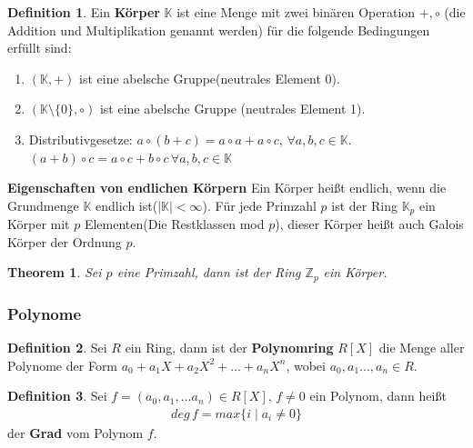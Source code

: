 \documentclass[12pt,oneside]{article}
\newtheorem{theorem}{Theorem}[section]
\theoremstyle{remark}
\theoremstyle{definition}
\newtheorem{definition}{Definition}[section]
\begin{document}
\begin{definition}
Ein \textbf{Körper} $\mathbb{K}$ ist eine Menge mit zwei binären Operation $+,\circ$ (die Addition und Multiplikation genannt werden) für die folgende Bedingungen erfüllt sind:
\begin{enumerate}
    \item $(\mathbb{K},+)$ ist eine abelsche Gruppe(neutrales Element 0).
    
    \item $(\mathbb{K}\setminus \{ 0\}, \circ)$ ist eine abelsche Gruppe (neutrales Element 1).
    
    \item Distributivgesetze:\newline
        $a \circ (b + c) = a \circ a + a \circ c, \, \forall a,b,c \in \mathbb{K}$.\newline
        $(a + b) \circ c = a \circ c + b \circ c \, \forall a,b,c \in \mathbb{K}$
\end{enumerate}
\end{definition}

\textbf{Eigenschaften von endlichen Körpern}\newline
Ein Körper heißt endlich, wenn die Grundmenge $\mathbb{K}$ endlich ist($|\mathbb{K}| < \infty$). Für jede Primzahl $p$ ist der Ring $\mathbb{K}_p$ ein Körper mit $p$ Elementen(Die Restklassen mod $p$), dieser Körper heißt auch Galois Körper der Ordnung $p$.

\begin{theorem}
Sei $p$ eine Primzahl, dann ist der Ring $\mathbb{Z}_p$ ein Körper.
\end{theorem}


 

\subsubsection{Polynome}

\begin{definition}
Sei $R$ ein Ring, dann ist der \textbf{Polynomring} $R[X]$ die Menge aller Polynome der Form $a_{0} + a_{1}X + a_{2} X^2 + ... + a_{n}X^n$, wobei $a_{0},a_{1}...,a_{n} \in R$.
\end{definition}

\smallskip

\begin{definition}
Sei $f = (a_0, a_1,...a_n) \in R[X], \, f \neq 0 $ ein Polynom, dann heißt
\begin{align*}
    deg \, f = max \{ i  \mid a_i \neq 0 \}
\end{align*}
der \textbf{Grad} vom Polynom $f$.  
\end{definition}
\end{document}
